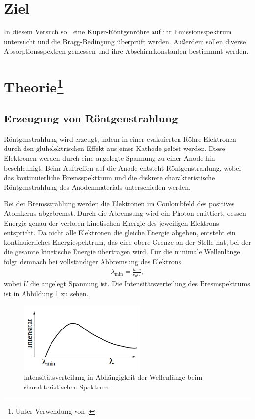 \section{Ziel}
In diesem Versuch soll eine Kuper-Röntgenröhre auf ihr Emissionsspektrum untersucht und die Bragg-Bedingung überprüft werden.
Außerdem sollen diverse Absorptionsspektren gemessen und ihre Abschirmkonstanten bestimmmt werden.


\section[Theorie]{Theorie\footnote[1]{Unter Verwendung von \cite[]{man:v602}.}}

\subsection{Erzeugung von Röntgenstrahlung}
Röntgenstrahlung wird erzeugt, indem in einer evakuierten Röhre Elektronen durch den glühelektrischen Effekt aus einer Kathode gelöst werden.
Diese Elektronen werden durch eine angelegte Spannung zu einer Anode hin beschleunigt.
Beim Auftreffen auf die Anode entsteht Röntgenstrahlung, wobei das kontinuierliche Bremsspekttrum und die diskrete charakteristische Röntgenstrahlung des Anodenmaterials unterschieden werden.

\noindent
Bei der Bremsstrahlung werden die Elektronen im Coulombfeld des positives Atomkerns abgebremst.
Durch die Abremsung wird ein Photon emittiert, dessen Energie genau der verloren kinetischen Energie des jeweiligen Elektrons entspricht.
Da nicht alle Elektronen die gleiche Energie abgeben, entsteht ein kontinuierliches Energiespektrum, das eine obere Grenze an der Stelle hat,
bei der die gesamte kinetische Energie übertragen wird.
Für die minimale Wellenlänge folgt demnach bei vollständiger Abbremsung des Elektrons
\begin{align}
    \lambda_\text{min} = \frac{h \cdot c}{e_0 U},
    \label{eq:wellenlaenge}
\end{align}
wobei $U$ die angelegt Spannung ist.
Die Intensitätsverteilung des Bresmspektrums ist in Abbildung \ref{fig:bremsspektrum} zu sehen.
\begin{figure}[H]
    \centering
    \includegraphics[height = 3.5cm]{Abbildungen/bremsspektrum.png}
    \caption{Intensitätsverteilung in Abhängigkeit der Wellenlänge beim charakteristischen Spektrum \cite[]{man:v602}.}
    \label{fig:bremsspektrum}
\end{figure}

